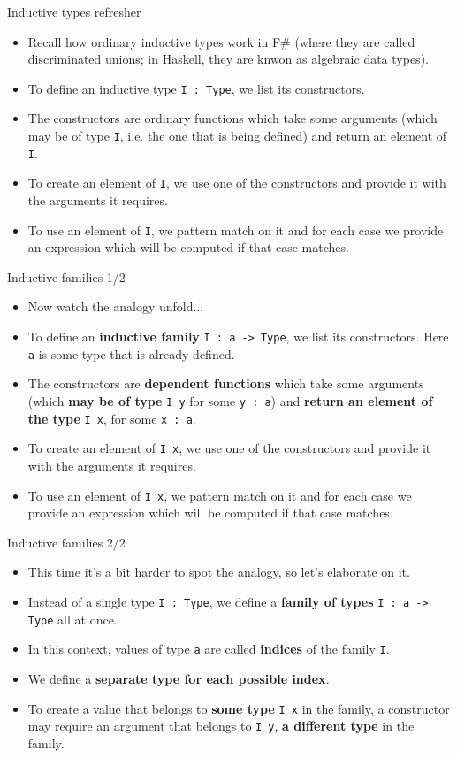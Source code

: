 \documentclass{beamer}
\newcommand{\m}[1]{\texttt{#1}}
\begin{document}
\begin{frame}{Inductive types refresher}
\begin{itemize}
	\item Recall how ordinary inductive types work in F\# (where they are called discriminated unions; in Haskell, they are knwon as algebraic data types).
	\item To define an inductive type \m{I :\ Type}, we list its constructors.
	\item The constructors are ordinary functions which take some arguments (which may be of type \m{I}, i.e. the one that is being defined) and return an element of \m{I}.
	\item To create an element of \m{I}, we use one of the constructors and provide it with the arguments it requires.
	\item To use an element of \m{I}, we pattern match on it and for each case we provide an expression which will be computed if that case matches.
\end{itemize}
\end{frame}

\begin{frame}{Inductive families 1/2}
\begin{itemize}
	\item Now watch the analogy unfold...
	\item To define an \textbf{inductive family} \m{I : a -> Type}, we list its constructors. Here \m{a} is some type that is already defined.
	\item The constructors are \textbf{dependent functions} which take some arguments (which \textbf{may be of type} \m{I y} for some \m{y :\ a}) and \textbf{return an element of the type} \m{I x}, for some \m{x :\ a}.
	\item To create an element of \m{I x}, we use one of the constructors and provide it with the arguments it requires.
	\item To use an element of \m{I x}, we pattern match on it and for each case we provide an expression which will be computed if that case matches.
\end{itemize}
\end{frame}

\begin{frame}{Inductive families 2/2}
\begin{itemize}
	\item This time it's a bit harder to spot the analogy, so let's elaborate on it.
	\item Instead of a single type \m{I :\ Type}, we define a \textbf{family of types} \m{I :\ a -> Type} all at once.
	\item In this context, values of type \m{a} are called \textbf{indices} of the family \m{I}.
	\item We define a \textbf{separate type for each possible index}.
	\item To create a value that belongs to \textbf{some type} \m{I x} in the family, a constructor may require an argument that belongs to \m{I y}, \textbf{a different type} in the family.
\end{itemize}
\end{frame}
\end{document}
